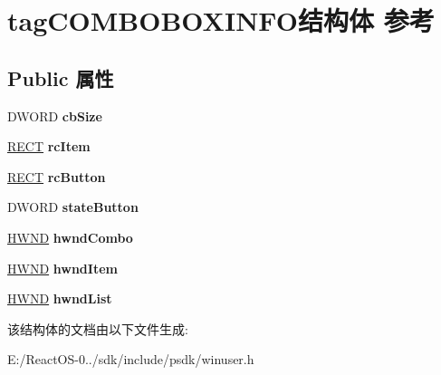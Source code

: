 \hypertarget{structtag_c_o_m_b_o_b_o_x_i_n_f_o}{}\section{tag\+C\+O\+M\+B\+O\+B\+O\+X\+I\+N\+F\+O结构体 参考}
\label{structtag_c_o_m_b_o_b_o_x_i_n_f_o}
\subsection*{Public 属性}
\begin{DoxyCompactItemize}
\item 
\mbox{\label{structtag_c_o_m_b_o_b_o_x_i_n_f_o_acab54848dccdb353c2efddbf6c14435c}} 
D\+W\+O\+RD {\bfseries cb\+Size}
\item 
\mbox{\label{structtag_c_o_m_b_o_b_o_x_i_n_f_o_a766d21f79d6987d3d809233902265cf5}} 
\hyperlink{structtag_r_e_c_t}{R\+E\+CT} {\bfseries rc\+Item}
\item 
\mbox{\label{structtag_c_o_m_b_o_b_o_x_i_n_f_o_a3828ff8b58334edacce7a7895e847f79}} 
\hyperlink{structtag_r_e_c_t}{R\+E\+CT} {\bfseries rc\+Button}
\item 
\mbox{\label{structtag_c_o_m_b_o_b_o_x_i_n_f_o_ad52596dbeee8058641a8cb8f79d0352d}} 
D\+W\+O\+RD {\bfseries state\+Button}
\item 
\mbox{\label{structtag_c_o_m_b_o_b_o_x_i_n_f_o_afa4dac01ecf8336f4397d0184bfe65cc}} 
\hyperlink{interfacevoid}{H\+W\+ND} {\bfseries hwnd\+Combo}
\item 
\mbox{\label{structtag_c_o_m_b_o_b_o_x_i_n_f_o_a636a8672805de3651de3da0355c952d1}} 
\hyperlink{interfacevoid}{H\+W\+ND} {\bfseries hwnd\+Item}
\item 
\mbox{\label{structtag_c_o_m_b_o_b_o_x_i_n_f_o_ac8bef123e6847707efcd3e40dae593d2}} 
\hyperlink{interfacevoid}{H\+W\+ND} {\bfseries hwnd\+List}
\end{DoxyCompactItemize}


该结构体的文档由以下文件生成\+:\begin{DoxyCompactItemize}
\item 
E\+:/\+React\+O\+S-\/0../sdk/include/psdk/winuser.\+h\end{DoxyCompactItemize}

